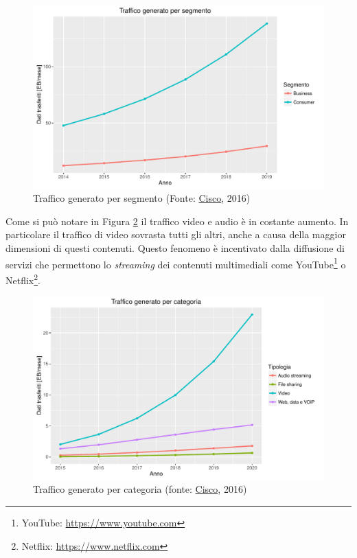 \begin{figure}[ht]
	\centering
	\includegraphics[width=\textwidth]{1-introduzione/Immagini/traffico-consumer-business.pdf}
	\caption[Traffico generato per segmento]{Traffico generato per segmento (Fonte: \href{http://www.cisco.com/c/en/us/solutions/collateral/service-provider/visual-networking-index-vni/VNI_Hyperconnectivity_WP.html}{Cisco}, 2016)\label{fig:analisi-dati-generati}}
\end{figure}

Come si può notare in Figura \ref{fig:traffico-categoria-applicazione} il traffico video e audio è in costante aumento. In particolare il traffico di video sovrasta tutti gli altri, anche a causa della maggior dimensioni di questi contenuti. Questo fenomeno è incentivato dalla diffusione di servizi che permettono lo \emph{streaming} dei contenuti multimediali come YouTube\footnote{YouTube: \url{https://www.youtube.com}} o Netflix\footnote{Netflix: \url{https://www.netflix.com}}.

\begin{figure}[ht]
	\centering
	\includegraphics[width=\textwidth]{1-introduzione/Immagini/traffico-categoria.pdf}
	\caption[Traffico generato per categoria]{Traffico generato per categoria (fonte: \href{http://www.cisco.com/c/en/us/solutions/collateral/service-provider/visual-networking-index-vni/mobile-white-paper-c11-520862.html}{Cisco}, 2016)\label{fig:traffico-categoria-applicazione}}
\end{figure}

